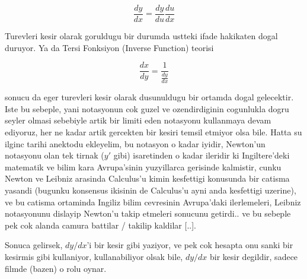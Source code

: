 \documentclass[12pt,fleqn]{article}\usepackage{../common}
\begin{document}
\[ \frac{dy}{dx} = \frac{dy}{du}\frac{du}{dx} \]

Turevleri kesir olarak goruldugu bir durumda ustteki ifade hakikaten dogal
duruyor. Ya da Tersi Fonksiyon (Inverse Function) teorisi

\[ \frac{dx}{dy} = \frac{1}{\frac{dy}{dx}} \]

sonucu da eger turevleri kesir olarak dusunuldugu bir ortamda dogal
gelecektir. Iste bu sebeple, yani notasyonun cok guzel ve ozendirdiginin
cogunlukla dogru seyler olmasi sebebiyle artik bir limiti eden notasyonu
kullanmaya devam ediyoruz, her ne kadar artik gercekten bir kesiri temsil
etmiyor olsa bile. Hatta su ilginc tarihi anektodu ekleyelim, bu notasyon o
kadar iyidir, Newton'un notasyonu olan tek tirnak ($y'$ gibi) isaretinden o
kadar ileridir ki Ingiltere'deki matematik ve bilim kara Avrupa'sinin
yuzyillarca gerisinde kalmistir, cunku Newton ve Leibniz arasinda
Calculus'u kimin kesfettigi konusunda bir catisma yasandi (bugunku
konsensus ikisinin de Calculus'u ayni anda kesfettigi uzerine), ve bu
catisma ortaminda Ingiliz bilim cevresinin Avrupa'daki ilerlemeleri,
Leibniz notasyonunu dislayip Newton'u takip etmeleri sonucunu getirdi.. ve
bu sebeple pek cok alanda camura battilar / takilip kaldilar [..].

Sonuca gelirsek, $dy/dx$'i bir kesir gibi yaziyor, ve pek cok hesapta onu
sanki bir kesirmis gibi kullaniyor, kullanabiliyor olsak bile, $dy/dx$ bir
kesir degildir, sadece filmde (bazen) o rolu oynar. 
\end{document}
